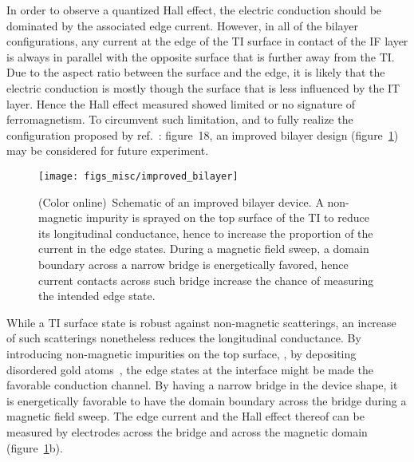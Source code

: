 In order to observe a quantized Hall effect, the electric conduction should be dominated by the associated edge current. However, in all of the bilayer configurations, any current at the edge of the TI surface in contact of the IF layer is always in parallel with the opposite surface that is further away from the TI. Due to the aspect ratio between the surface and the edge, it is likely that the electric conduction is mostly though the surface that is less influenced by the IT layer. Hence the Hall effect measured showed limited or no signature of ferromagnetism. To circumvent such limitation, and to fully realize the configuration proposed by ref.~\cite{TI_Col}: figure~18, an improved bilayer design (figure~\ref{fig:improved_bilayer}) may be considered for future experiment.%
%
\begin{figure}[ht]%
    \centering%
    \texttt{[image: figs\_misc/improved\_bilayer]}%
    \caption[Schematic of an improved bilayer device]{\label{fig:improved_bilayer}(Color online)~Schematic of an improved bilayer device. A non-magnetic impurity is sprayed on the top surface of the TI to reduce its longitudinal conductance, hence to increase the proportion of the current in the edge states. During a magnetic field sweep, a domain boundary across a narrow bridge is energetically favored, hence current contacts across such bridge increase the chance of measuring the intended edge state.}%
\end{figure} %
%
While a TI surface state is robust against non-magnetic scatterings, an increase of such scatterings nonetheless reduces the longitudinal conductance. By introducing non-magnetic impurities on the top surface, , by depositing disordered gold atoms~\cite{TI_WAL_Hongkong}, the edge states at the interface might be made the favorable conduction channel. By having a narrow bridge in the device shape, it is energetically favorable to have the domain boundary across the bridge during a magnetic field sweep. The edge current and the Hall effect thereof can be measured by electrodes across the bridge and across the magnetic domain (figure~\ref{fig:improved_bilayer}b).